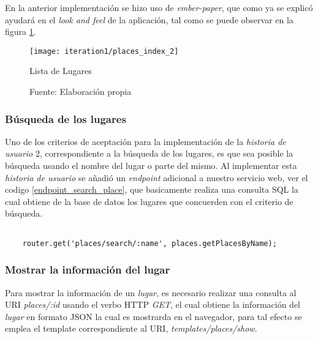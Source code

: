 En la anterior implementación se hizo uso de \emph{ember-paper}, que como ya se explicó ayudará en el \emph{look and feel} de la aplicación, tal como se puede observar en la figura \ref{fig:places_index}. \\


\begin{figure}[H]
  \begin{center}
    \texttt{[image: iteration1/places\_index\_2]}
    \caption{Lista de Lugares}
    \label{fig:places_index}
    \caption*{Fuente: Elaboración propia}
  \end{center}
\end{figure}


\subsubsection{Búsqueda de los lugares}
\label{subs:busqueda de los lugares}

Uno de los criterios de aceptación para la implementación de la \emph{historia de usuario} 2, correspondiente a la búsqueda de los lugares, es que sea posible la búsqueda usando el nombre del lugar o parte del mismo. Al implementar esta \emph{historia de usuario} se a\~nadi\'o un \emph{endpoint} adicional a nuestro servicio web, ver el codigo \ref{endpoint_search_place}, que basicamente realiza una consulta SQL la cual obtiene de la base de datos los lugares que concuerden con el criterio de búsqueda. \\

\begin{center}
  \begin{lstlisting}[label=endpoint_search_place,caption=Implementación de la búsqueda de lugares en el Servicio Web]

    router.get('places/search/:name', places.getPlacesByName);

  \end{lstlisting}
\end{center}


\subsubsection{Mostrar la información del lugar}
\label{subs:Mostrar información del lugar}

Para mostrar la información de un \emph{lugar}, es necesario realizar una consulta al URI \emph{places/:id} usando el verbo HTTP \emph{GET}, el cual obtiene la información del \emph{lugar} en formato JSON la cual es mostrarda en el navegador, para tal efecto se emplea el template correspondiente al URI,  \emph{templates/places/show}. \\

